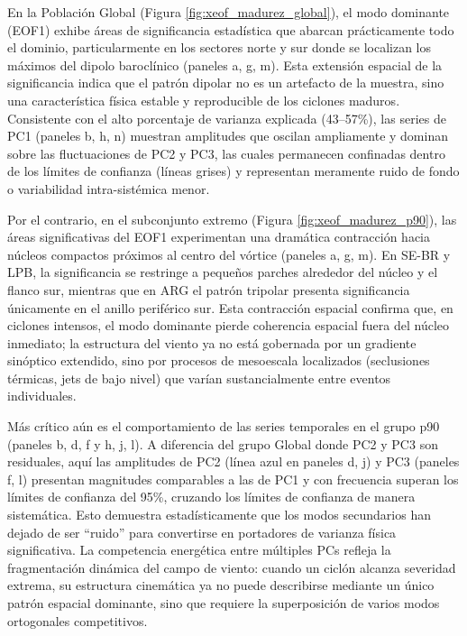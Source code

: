 En la Población Global (Figura \ref{fig:xeof_madurez_global}), el modo dominante (EOF1) exhibe áreas de significancia estadística que abarcan prácticamente todo el dominio, particularmente en los sectores norte y sur donde se localizan los máximos del dipolo baroclínico (paneles a, g, m). Esta extensión espacial de la significancia indica que el patrón dipolar no es un artefacto de la muestra, sino una característica física estable y reproducible de los ciclones maduros. Consistente con el alto porcentaje de varianza explicada (43--57\%), las series de PC1 (paneles b, h, n) muestran amplitudes que oscilan ampliamente y dominan sobre las fluctuaciones de PC2 y PC3, las cuales permanecen confinadas dentro de los límites de confianza (líneas grises) y representan meramente ruido de fondo o variabilidad intra-sistémica menor.

Por el contrario, en el subconjunto extremo (Figura \ref{fig:xeof_madurez_p90}), las áreas significativas del EOF1 experimentan una dramática contracción hacia núcleos compactos próximos al centro del vórtice (paneles a, g, m). En SE-BR y LPB, la significancia se restringe a pequeños parches alrededor del núcleo y el flanco sur, mientras que en ARG el patrón tripolar presenta significancia únicamente en el anillo periférico sur. Esta contracción espacial confirma que, en ciclones intensos, el modo dominante pierde coherencia espacial fuera del núcleo inmediato; la estructura del viento ya no está gobernada por un gradiente sinóptico extendido, sino por procesos de mesoescala localizados (seclusiones térmicas, jets de bajo nivel) que varían sustancialmente entre eventos individuales.

Más crítico aún es el comportamiento de las series temporales en el grupo p90 (paneles b, d, f y h, j, l). A diferencia del grupo Global donde PC2 y PC3 son residuales, aquí las amplitudes de PC2 (l\'inea azul en paneles d, j) y PC3 (paneles f, l) presentan magnitudes comparables a las de PC1 y con frecuencia superan los l\'imites de confianza del 95\%, cruzando los límites de confianza de manera sistemática. Esto demuestra estadísticamente que los modos secundarios han dejado de ser ``ruido'' para convertirse en portadores de varianza física significativa. La competencia energética entre múltiples PCs refleja la fragmentación dinámica del campo de viento: cuando un ciclón alcanza severidad extrema, su estructura cinemática ya no puede describirse mediante un único patrón espacial dominante, sino que requiere la superposición de varios modos ortogonales competitivos.

